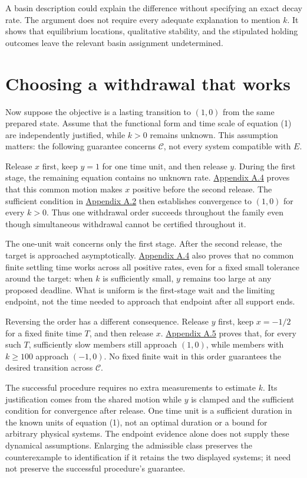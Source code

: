 A basin description could explain the difference without specifying an exact decay rate. The argument does not require every adequate explanation to mention \(k\). It shows that equilibrium locations, qualitative stability, and the stipulated holding outcomes leave the relevant basin assignment undetermined.

\section*{Choosing a withdrawal that works}

Now suppose the objective is a lasting transition to \((1,0)\) from the same prepared state. Assume that the functional form and time scale of equation (1) are independently justified, while \(k>0\) remains unknown. This assumption matters: the following guarantee concerns \(\mathcal C\), not every system compatible with \(E\).

Release \(x\) first, keep \(y=1\) for one time unit, and then release \(y\). During the first stage, the remaining equation contains no unknown rate. \hyperref[app:a.4]{Appendix A.4} proves that this common motion makes \(x\) positive before the second release. The sufficient condition in \hyperref[app:a.2]{Appendix A.2} then establishes convergence to \((1,0)\) for every \(k>0\). Thus one withdrawal order succeeds throughout the family even though simultaneous withdrawal cannot be certified throughout it.

The one-unit wait concerns only the first stage. After the second release, the target is approached asymptotically. \hyperref[app:a.4]{Appendix A.4} also proves that no common finite settling time works across all positive rates, even for a fixed small tolerance around the target: when \(k\) is sufficiently small, \(y\) remains too large at any proposed deadline. What is uniform is the first-stage wait and the limiting endpoint, not the time needed to approach that endpoint after all support ends.

Reversing the order has a different consequence. Release \(y\) first, keep \(x=-1/2\) for a fixed finite time \(T\), and then release \(x\). \hyperref[app:a.5]{Appendix A.5} proves that, for every such \(T\), sufficiently slow members still approach \((1,0)\), while members with \(k\geq100\) approach \((-1,0)\). No fixed finite wait in this order guarantees the desired transition across \(\mathcal C\).

The successful procedure requires no extra measurements to estimate \(k\). Its justification comes from the shared motion while \(y\) is clamped and the sufficient condition for convergence after release. One time unit is a sufficient duration in the known units of equation (1), not an optimal duration or a bound for arbitrary physical systems. The endpoint evidence alone does not supply these dynamical assumptions. Enlarging the admissible class preserves the counterexample to identification if it retains the two displayed systems; it need not preserve the successful procedure’s guarantee.

